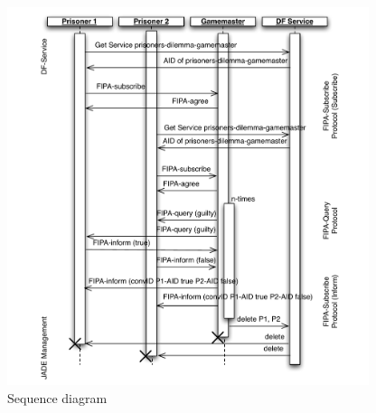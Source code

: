 \documentclass[a4paper,12pt]{article}
\begin{document}
\begin{figure}[h]
	\centering
	\includegraphics[width=400px]{chart1_Part1.pdf}
	\caption{Sequence diagram}
	\label{fig:sequence}
\end{figure}

\end{document}

